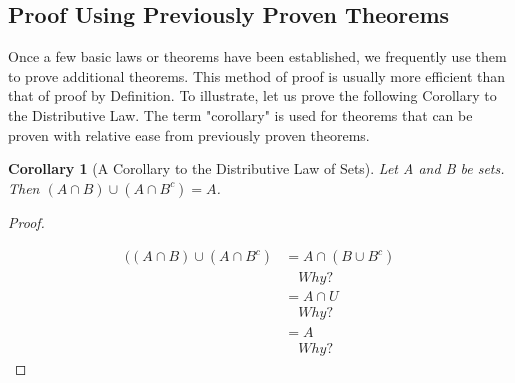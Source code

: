 \documentclass[10pt,]{book}
\theoremstyle{plain}
\newtheorem{corollary}[theorem]{Corollary}
\theoremstyle{definition}
\theoremstyle{definition}
\theoremstyle{definition}
\begin{document}
\subsection[Proof Using Previously Proven Theorems]{Proof Using Previously Proven Theorems}\label{ss-proof-with-theorems}
Once a few basic laws or theorems have been established, we frequently use them to prove additional theorems. This method of proof is usually more efficient than that of proof by Definition. To illustrate, let us prove the following Corollary to the Distributive Law.   The term "corollary" is used for theorems that can be proven with relative ease from previously proven theorems.
%
\begin{corollary}[A Corollary to the Distributive Law of Sets]\label{th-corrollary-to-distr}
Let A and B be sets. Then \((A\cap  B) \cup  (A\cap  B^c) = A\).%
\end{corollary}
\begin{proof}\hypertarget{proof-3}{}
\begin{equation*}
\begin{split}
((A\cap  B) \cup  (A\cap  B^c) & = A \cap (B \cup B^c)\\
		 & \quad Why?\\
		& = A \cap U\\ 
		&\quad  Why?\\
		& = A\\
		&\quad Why? 
\end{split}
\end{equation*}%
\end{proof}
\typeout{************************************************}
\typeout{************************************************}
\end{document}
